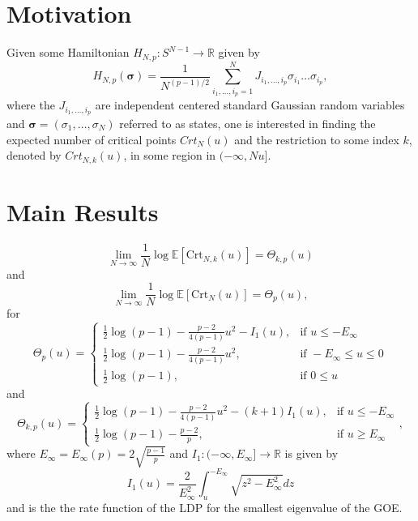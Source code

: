 \section{Motivation}
Given some Hamiltonian $H_{N,p}: S^{N-1}\rightarrow\mathbb R$ given by $$H_{N,p}(\bm\sigma)=\frac{1}{N^{(p-1)/2}}\sum_{i_1,\dots,i_p=1}^N J_{i_1,\dots,i_p}\sigma_{i_1}\dots\sigma_{i_p},$$ where the $J_{i_1,\dots,i_p}$ are independent centered standard Gaussian random variables and $\bm\sigma=(\sigma_1,\dots,\sigma_N)$ referred to as states, one is interested in finding the expected number of critical points $Crt_N(u)$ and the restriction to some index $k$, denoted by $Crt_{N,k}(u)$, in some region in $(-\infty,Nu]$.

\section{Main Results}
\begin{theorem}
	\begin{equation}\label{thm:2.5}
		\lim_{N\rightarrow\infty}\frac{1}{N}\log\mathbb E[\text{Crt}_{N,k}(u)] = \Theta_{k,p}(u)
	\end{equation}
	and
	\begin{equation}\label{thm:2.8}
		\lim_{N\rightarrow\infty}\frac{1}{N}\log\mathbb E[\text{Crt}_N(u)] = \Theta_p(u),
	\end{equation}
	for $$\Theta_p(u)=\begin{cases}
						\frac{1}{2}\log(p-1)-\frac{p-2}{4(p-1)}u^2-I_1(u), &\mbox{if } u\leq-E_\infty \\
						\frac{1}{2}\log(p-1)-\frac{p-2}{4(p-1)}u^2, &\mbox{if } -E_\infty\leq u\leq 0\\ 
						\frac{1}{2}\log(p-1), &\mbox{if } 0\leq u
					  \end{cases}$$
	and
	$$\Theta_{k,p}(u)=\begin{cases}
						\frac{1}{2}\log(p-1)-\frac{p-2}{4(p-1)}u^2-(k+1)I_1(u), &\mbox{if } u\leq-E_\infty \\
						\frac{1}{2}\log(p-1)-\frac{p-2}{p}, &\mbox{if } u \geq E_\infty
					  \end{cases},$$
	where $E_\infty=E_\infty(p)=2\sqrt{\frac{p-1}{p}}$ and $I_1:(-\infty,E_\infty]\rightarrow\mathbb R$ is given by $$I_1(u)=\frac{2}{E_\infty^2}\int_u^{-E_\infty}\sqrt{z^2-E_\infty^2}dz$$ and is the the rate function of the LDP for the smallest eigenvalue of the GOE.
\end{theorem}

